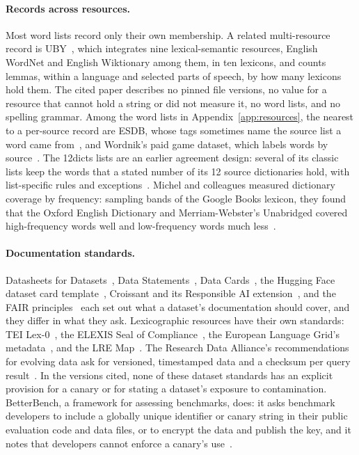 \documentclass[11pt]{article}
\begin{document}
\paragraph{Records across resources.} Most word lists record only their own membership. A related
multi-resource record is UBY~\cite{gurevych2012uby}, which integrates nine lexical-semantic
resources, English WordNet and English Wiktionary among them, in ten lexicons, and counts lemmas,
within a language and selected parts of speech, by how many lexicons hold them. The cited paper describes no pinned file versions, no value for a
resource that cannot hold a string or did not measure it, no word lists, and no spelling grammar. Among the word lists in
Appendix~\ref{app:resources}, the nearest to a per-source record are ESDB, whose tags sometimes name
the source list a word came from~\cite{atkinson2026a}, and Wordnik's paid game dataset, which labels
words by source~\cite{wordnik2026}. The 12dicts lists are an earlier agreement design: several of its
classic lists keep the words that a stated number of its 12 source dictionaries hold, with
list-specific rules and exceptions~\cite{beale2026}.
Michel and colleagues measured dictionary coverage by frequency: sampling bands of the Google Books
lexicon, they found that the Oxford English Dictionary and Merriam-Webster's Unabridged covered
high-frequency words well and low-frequency words much less~\cite{michel2011}.

\paragraph{Documentation standards.} Datasheets for Datasets~\cite{gebru2021}, Data
Statements~\cite{bender2018,bender2021,mcmillanmajor2024}, Data Cards~\cite{pushkarna2022}, the
Hugging Face dataset card template~\cite{huggingface2026}, Croissant and its Responsible AI
extension~\cite{akhtar2024,mlcommons2026,mlcommons2024,akhtar2024a}, and the FAIR
principles~\cite{wilkinson2016} each set out what a dataset's documentation should cover, and
they differ in what they ask. Lexicographic resources have their own standards: TEI
Lex-0~\cite{teilex2026}, the ELEXIS Seal of Compliance~\cite{tasovac2021}, the European Language
Grid's metadata~\cite{labropoulou2020}, and the LRE Map~\cite{calzolari2012}. The Research Data
Alliance's recommendations for evolving data ask for versioned, timestamped data and a checksum per
query result~\cite{rauber2015}. In the versions cited, none of these dataset standards has an
explicit provision for a canary or for stating a dataset's exposure to contamination. BetterBench, a framework for assessing benchmarks, does: it
asks benchmark developers to include a globally unique identifier or canary string in their public
evaluation code and data files, or to encrypt the data and publish the key, and it notes that developers cannot enforce a
canary's use~\cite{reuel2024betterbench}.
\end{document}
